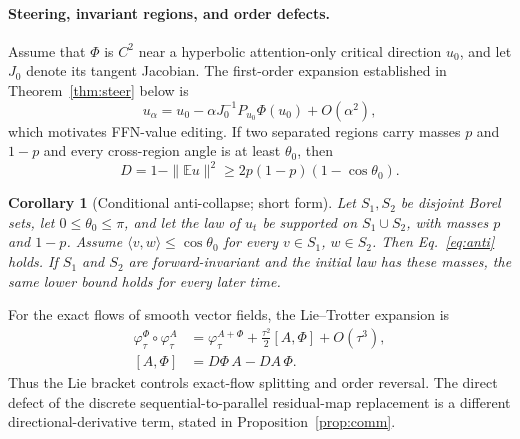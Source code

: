 \documentclass[11pt]{article}
\newtheorem{corollary}{Corollary}
\begin{document}
\paragraph{Steering, invariant regions, and order defects.}
Assume that $\Phi$ is $C^2$ near a hyperbolic attention-only critical direction $u_0$, and let $J_0$ denote its tangent Jacobian. The first-order expansion established in Theorem~\ref{thm:steer} below is
\begin{equation}
u_\alpha=u_0-\alpha J_0^{-1}P_{u_0}\Phi(u_0)+O(\alpha^2),
\label{eq:steer}
\end{equation}
which motivates FFN-value editing. If two separated regions carry masses $p$ and
$1-p$ and every cross-region angle is at least $\theta_0$, then
\begin{equation}D=1-\|\mathbb E u\|^2\ge 2p(1-p)(1-\cos\theta_0).
\label{eq:anti}\end{equation}
\begin{corollary}[Conditional anti-collapse; short form]\label{cor:anti}
Let $S_1,S_2$ be disjoint Borel sets, let $0\le\theta_0\le\pi$, and
let the law of $u_t$ be supported on $S_1\cup S_2$, with masses $p$ and $1-p$.
Assume $\langle v,w\rangle\le\cos\theta_0$ for every $v\in S_1$,
$w\in S_2$. Then Eq.~\eqref{eq:anti} holds. If $S_1$ and $S_2$
are forward-invariant and the initial law has these masses, the same lower bound
holds for every later time.
\end{corollary}
For the exact flows of smooth vector fields, the Lie--Trotter expansion is
\begin{equation}
\begin{aligned}
\varphi^\Phi_\tau\circ\varphi^A_\tau
&=\varphi^{A+\Phi}_\tau
  +\frac{\tau^2}{2}[A,\Phi]+O(\tau^3),\\[-1mm]
[A,\Phi]&=D\Phi\,A-DA\,\Phi.
\end{aligned}
\label{eq:comm}
\end{equation}
Thus the Lie bracket controls exact-flow splitting and order reversal. The direct
defect of the discrete sequential-to-parallel residual-map replacement is a
different directional-derivative term, stated in Proposition~\ref{prop:comm}.
\end{document}
